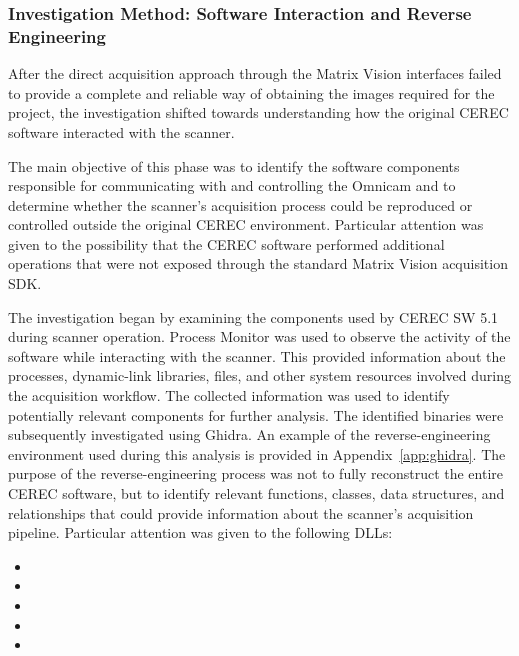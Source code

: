\subsubsection{Investigation Method: Software Interaction and Reverse Engineering}

After the direct acquisition approach through the Matrix Vision interfaces failed to provide a complete and reliable way of obtaining the images required for the project, the investigation shifted towards understanding how the original CEREC software interacted with the scanner.

The main objective of this phase was to identify the software components responsible for communicating with and controlling the Omnicam and to determine whether the scanner's acquisition process could be reproduced or controlled outside the original CEREC environment. Particular attention was given to the possibility that the CEREC software performed additional operations that were not exposed through the standard Matrix Vision acquisition SDK.

The investigation began by examining the components used by CEREC SW 5.1 during scanner operation. Process Monitor was used to observe the activity of the software while interacting with the scanner. This provided information about the processes, dynamic-link libraries, files, and other system resources involved during the acquisition workflow. The collected information was used to identify potentially relevant components for further analysis. The identified binaries were subsequently investigated using Ghidra. An example of the reverse-engineering environment used during this analysis is provided in Appendix~\ref{app:ghidra}.
The purpose of the reverse-engineering process was not to fully reconstruct the entire CEREC software, but to identify relevant functions, classes, data structures, and relationships that could provide information about the scanner's acquisition pipeline. Particular attention was given to the following DLLs:

\begin{itemize}
    \item {}
    \item {}
    \item {}
    \item {}
    \item {}
\end{itemize}

